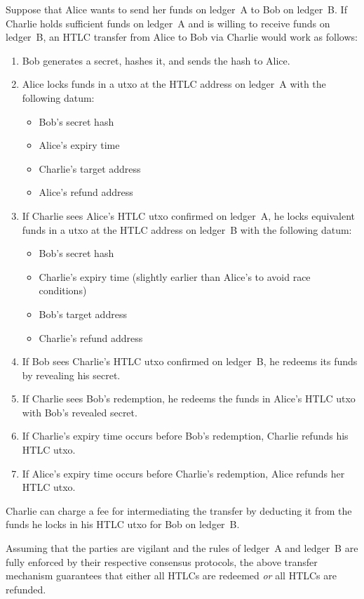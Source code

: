 \documentclass[11pt,a4paper,oneside]{article}
\begin{document}
\begin{multicols}{2}
Suppose that Alice wants to send her funds on ledger~A to Bob on ledger~B.
If Charlie holds sufficient funds on ledger~A and is willing to receive funds on ledger~B, an HTLC transfer from Alice to Bob via Charlie would work as follows:
\begin{enumerate}
  \item Bob generates a secret, hashes it, and sends the hash to Alice.
  \item Alice locks funds in a utxo at the HTLC address on ledger~A with the following datum:
    \begin{itemize}
      \item Bob's secret hash
      \item Alice's expiry time
      \item Charlie's target address
      \item Alice's refund address
    \end{itemize}
  \item If Charlie sees Alice's HTLC utxo confirmed on ledger~A, he locks equivalent funds in a utxo at the HTLC address on ledger~B with the following datum:
    \begin{itemize}
      \item Bob's secret hash
      \item Charlie's expiry time (slightly earlier than Alice's to avoid race conditions)
      \item Bob's target address
      \item Charlie's refund address
    \end{itemize}
  \item If Bob sees Charlie's HTLC utxo confirmed on ledger~B, he redeems its funds by revealing his secret.
  \item If Charlie sees Bob's redemption, he redeems the funds in Alice's HTLC utxo with Bob's revealed secret.
  \item If Charlie's expiry time occurs before Bob's redemption, Charlie refunds his HTLC utxo.
  \item If Alice's expiry time occurs before Charlie's redemption, Alice refunds her HTLC utxo.
\end{enumerate}
Charlie can charge a fee for intermediating the transfer by deducting it from the funds he locks in his HTLC utxo for Bob on ledger~B.

Assuming that the parties are vigilant and the rules of ledger~A and ledger~B are fully enforced by their respective consensus protocols, the above transfer mechanism guarantees that either all HTLCs are redeemed \emph{or} all HTLCs are refunded.


\end{multicols}
\end{document}
